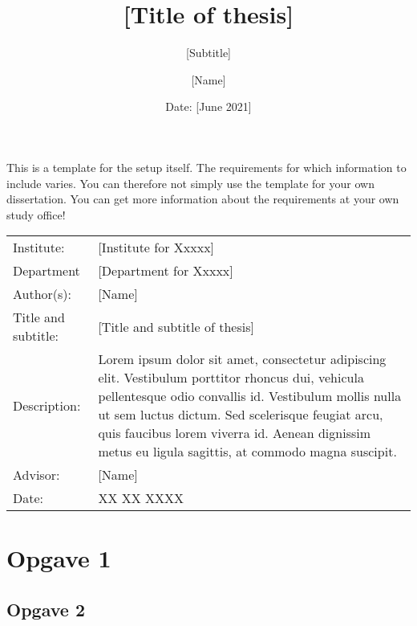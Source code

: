 \documentclass[12pt]{article}
\author{[Name]}
\title{[Title of thesis]}
\subtitle{[Subtitle]}
\date{Date: {[June 2021]}}
\begin{document}
\maketitle

\onehalfspacing

\noindent This is a template for the setup itself. The requirements for which information to include varies. You can therefore not simply use the template for your own dissertation. You can get more information about the requirements at your own study office!
\begin{table}[h]
\def\arraystretch{1.5}
\begin{tabularx}{\textwidth}{l X}
Institute: & {[Institute for Xxxxx]}  \\
Department & {[Department for Xxxxx]} \\
Author(s): & {[Name]} \\
Title and subtitle: & {[Title and subtitle of thesis]} \\
Description: & Lorem ipsum dolor sit amet, consectetur adipiscing elit. Vestibulum porttitor rhoncus dui, vehicula pellentesque odio convallis id. Vestibulum mollis nulla ut sem luctus dictum. Sed scelerisque feugiat arcu, quis faucibus lorem viverra id. Aenean dignissim metus eu ligula sagittis, at commodo magna suscipit. \\
Advisor: & {[Name]} \\
Date: & XX XX XXXX
\end{tabularx}
\end{table}
\newpage

\tableofcontents
\newpage

{\selectfont


\section{Opgave 1}

\subsection{Opgave 2}




}
\end{document}
